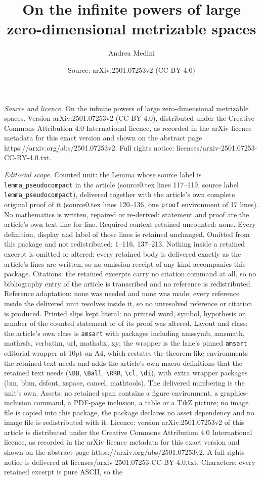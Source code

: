 \documentclass[10pt,a4paper]{amsart}
\title[On the infinite powers of large zero-dimensional metrizable ]{On the infinite powers of large zero-dimensional metrizable spaces}
\author{Andrea Medini}
\date{Source: arXiv:2501.07253v2 (CC BY 4.0)}
\begin{document}
\maketitle

\noindent\emph{Source and licence.} On the infinite powers of large zero-dimensional metrizable spaces. Version arXiv:2501.07253v2 (CC BY 4.0), distributed under the Creative Commons Attribution 4.0 International licence, as recorded in the arXiv licence metadata for this exact version and shown on the abstract page https://arxiv.org/abs/2501.07253v2. Full rights notice: licenses/arxiv-2501.07253-CC-BY-4.0.txt.\par\smallskip

\noindent\textit{Editorial scope.} Counted unit: the Lemma whose source label is \texttt{lemma\_pseudocompact} in the article (source0.tex lines 117--119, source label \texttt{lemma\_pseudocompact}), delivered together with the article's own complete original proof of it (source0.tex lines 120--136, one \texttt{proof} environment of 17 lines). No mathematics is written, repaired or re-derived: statement and proof are the article's own text line for line. Required context retained uncounted: none. Every definition, display and label of those lines is retained unchanged. Omitted from this package and not redistributed: 1--116, 137--213. Nothing inside a retained excerpt is omitted or altered: every retained body is delivered exactly as the article's lines are written, so no omission receipt of any kind accompanies this package. Citations: the retained excerpts carry no citation command at all, so no bibliography entry of the article is transcribed and no reference is redistributed. Reference adaptation: none was needed and none was made; every reference inside the delivered unit resolves inside it, so no unresolved reference or citation is produced. Printed slips kept literal: no printed word, symbol, hypothesis or number of the counted statement or of its proof was altered. Layout and class: the article's own class is \texttt{amsart} with packages including amssymb, amsmath, mathrsfs, verbatim, url, mathabx, xy; the wrapper is the lane's pinned \texttt{amsart} editorial wrapper at 10pt on A4, which restates the theorem-like environments the retained text needs and adds the article's own macro definitions that the retained text needs (\texttt{\textbackslash BB}, \texttt{\textbackslash Ball}, \texttt{\textbackslash RRR}, \texttt{\textbackslash cl}, \texttt{\textbackslash di}), with extra wrapper packages (bm, bbm, dsfont, xspace, cancel, mathtools). The delivered numbering is the unit's own. Assets: no retained span contains a figure environment, a graphics-inclusion command, a PDF-page inclusion, a table or a TikZ picture; no image file is copied into this package, the package declares no asset dependency and no image file is redistributed with it. Licence: version arXiv:2501.07253v2 of this article is distributed under the Creative Commons Attribution 4.0 International licence, as recorded in the arXiv licence metadata for this exact version and shown on the abstract page https://arxiv.org/abs/2501.07253v2. A full rights notice is delivered at licenses/arxiv-2501.07253-CC-BY-4.0.txt. Characters: every retained excerpt is pure ASCII, so the 
\end{document}
